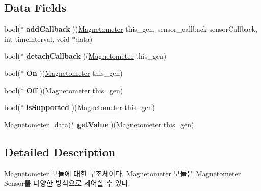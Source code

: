 \subsection*{Data Fields}
\begin{DoxyCompactItemize}
\item 
\hypertarget{struct__Magnetometer_aa97811d8ff97e63d37b695621c93ddd1}{bool($\ast$ {\bfseries add\-Callback} )(\hyperlink{struct__Magnetometer}{Magnetometer} this\-\_\-gen, sensor\-\_\-callback sensor\-Callback, int timeinterval, void $\ast$data)}\label{struct__Magnetometer_aa97811d8ff97e63d37b695621c93ddd1}

\item 
\hypertarget{struct__Magnetometer_a4af51e807baed6e87e3e6f7f509824e4}{bool($\ast$ {\bfseries detach\-Callback} )(\hyperlink{struct__Magnetometer}{Magnetometer} this\-\_\-gen)}\label{struct__Magnetometer_a4af51e807baed6e87e3e6f7f509824e4}

\item 
\hypertarget{struct__Magnetometer_aca82b27cfacc817306728b032909a7d5}{bool($\ast$ {\bfseries On} )(\hyperlink{struct__Magnetometer}{Magnetometer} this\-\_\-gen)}\label{struct__Magnetometer_aca82b27cfacc817306728b032909a7d5}

\item 
\hypertarget{struct__Magnetometer_ab987078b8057e016a32165087eb8fffc}{bool($\ast$ {\bfseries Off} )(\hyperlink{struct__Magnetometer}{Magnetometer} this\-\_\-gen)}\label{struct__Magnetometer_ab987078b8057e016a32165087eb8fffc}

\item 
\hypertarget{struct__Magnetometer_a1a1f2459baf385d09129335c806b66fe}{bool($\ast$ {\bfseries is\-Supported} )(\hyperlink{struct__Magnetometer}{Magnetometer} this\-\_\-gen)}\label{struct__Magnetometer_a1a1f2459baf385d09129335c806b66fe}

\item 
\hypertarget{struct__Magnetometer_a50494d12eb8d68827c7ea74b34dd2261}{\hyperlink{Sensor_8h_df/d29/struct__3d__data}{Magnetometer\-\_\-data}($\ast$ {\bfseries get\-Value} )(\hyperlink{struct__Magnetometer}{Magnetometer} this\-\_\-gen)}\label{struct__Magnetometer_a50494d12eb8d68827c7ea74b34dd2261}

\end{DoxyCompactItemize}


\subsection{Detailed Description}
Magnetometer 모듈에 대한 구조체이다. Magnetometer 모듈은 Magnetometer Sensor를 다양한 방식으로 제어할 수 있다. 

